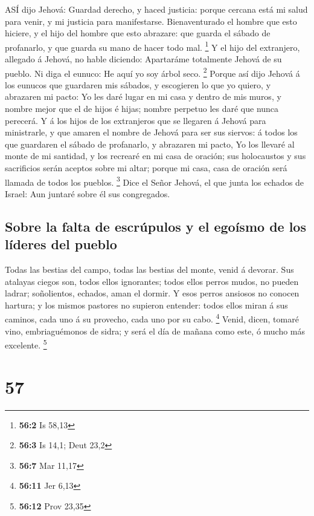  ASÍ dijo Jehová: Guardad derecho, y haced justicia: porque
cercana está mi salud para venir, y mi justicia para manifestarse.
 Bienaventurado el hombre que esto hiciere, y el hijo del
hombre que esto abrazare: que guarda el sábado de profanarlo, y que
guarda su mano de hacer todo mal. \footnote{\textbf{56:2} Is 58,13}
 Y el hijo del extranjero, allegado á Jehová, no hable
diciendo: Apartaráme totalmente Jehová de su pueblo. Ni diga el eunuco:
He aquí yo soy árbol seco. \footnote{\textbf{56:3} Is 14,1; Deut 23,2}
 Porque así dijo Jehová á los eunucos que guardaren mis
sábados, y escogieren lo que yo quiero, y abrazaren mi pacto:
 Yo les daré lugar en mi casa y dentro de mis muros, y
nombre mejor que el de hijos é hijas; nombre perpetuo les daré que nunca
perecerá.  Y á los hijos de los extranjeros que se llegaren
á Jehová para ministrarle, y que amaren el nombre de Jehová para ser sus
siervos: á todos los que guardaren el sábado de profanarlo, y abrazaren
mi pacto,  Yo los llevaré al monte de mi santidad, y los
recrearé en mi casa de oración; sus holocaustos y sus sacrificios serán
aceptos sobre mi altar; porque mi casa, casa de oración será llamada de
todos los pueblos. \footnote{\textbf{56:7} Mar 11,17}  Dice
el Señor Jehová, el que junta los echados de Israel: Aun juntaré sobre
él sus congregados.

\hypertarget{sobre-la-falta-de-escruxfapulos-y-el-egouxedsmo-de-los-luxedderes-del-pueblo}{%
\subsection{Sobre la falta de escrúpulos y el egoísmo de los líderes del
pueblo}\label{sobre-la-falta-de-escruxfapulos-y-el-egouxedsmo-de-los-luxedderes-del-pueblo}}

 Todas las bestias del campo, todas las bestias del monte,
venid á devorar.  Sus atalayas ciegos son, todos ellos
ignorantes; todos ellos perros mudos, no pueden ladrar; soñolientos,
echados, aman el dormir.  Y esos perros ansiosos no conocen
hartura; y los mismos pastores no supieron entender: todos ellos miran á
sus caminos, cada uno á su provecho, cada uno por su cabo. \footnote{\textbf{56:11}
  Jer 6,13}  Venid, dicen, tomaré vino, embriaguémonos de
sidra; y será el día de mañana como este, ó mucho más excelente.
\footnote{\textbf{56:12} Prov 23,35}

\hypertarget{section-56}{%
\section{57}\label{section-56}}


